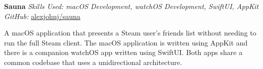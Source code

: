 \textbf{Sauna}  \newline
\textit{Skills Used: macOS Development, watchOS Development, SwiftUI, AppKit}\\
\textit{GitHub:} \href{https://github.com/\myweb/Sauna}{alexjohnj/sauna}

A macOS application that presents a Steam user's friends list without needing to
run the full Steam client. The macOS application is written using AppKit and
there is a companion watchOS app written using SwiftUI\@. Both apps share a
common codebase that uses a unidirectional architecture.

